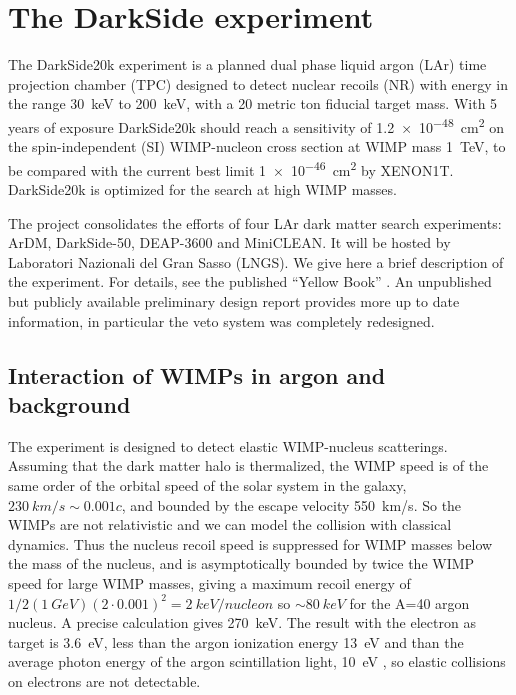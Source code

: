 \chapter{The DarkSide experiment}
\label{ch:darkside}

The DarkSide20k experiment is a planned dual phase liquid argon (LAr) time
projection chamber (TPC) designed to detect nuclear recoils (NR) with energy in
the range \SI{30}{keV} to \SI{200}{keV}, with a 20 metric ton fiducial target
mass. With 5 years of exposure DarkSide20k should reach a sensitivity of
\SI{1.2e-48}{cm^2} on the spin-independent (SI) WIMP-nucleon cross section at
WIMP mass \SI{1}{TeV}, to be compared with the current best limit
\SI{1e-46}{cm^2} by XENON1T. DarkSide20k is optimized for the search at high
WIMP masses.

The project consolidates the efforts of four LAr dark matter search
experiments: ArDM, DarkSide-50, DEAP-3600 and MiniCLEAN. It will be hosted by
Laboratori Nazionali del Gran Sasso (LNGS). We give here a brief description of
the experiment. For details, see the published ``Yellow Book''
\cite{aalseth2018}. An unpublished but publicly available preliminary design
report \cite{aalseth2019} provides more up to date information, in particular
the veto system was completely redesigned.

\section{Interaction of WIMPs in argon and background}

The experiment is designed to detect elastic WIMP-nucleus scatterings. Assuming
that the dark matter halo is thermalized, the WIMP speed is of the same order
of the orbital speed of the solar system in the galaxy, $\SI{230}{km/s}\sim
0.001 c$, and bounded by the escape velocity \SI{550}{km/s}. So the WIMPs are
not relativistic and we can model the collision with classical dynamics. Thus
the nucleus recoil speed is suppressed for WIMP masses below the mass of the
nucleus, and is asymptotically bounded by twice the WIMP speed for large WIMP
masses, giving a maximum recoil energy of $1/2 (\SI{1}{GeV}) (2 \cdot 0.001)^2
= \SI{2}{keV/nucleon}$ so $\sim\SI{80}{keV}$ for the A=40 argon nucleus. A
precise calculation gives \SI{270}{keV}. The result with the electron as target
is \SI{3.6}{eV}, less than the argon ionization energy \SI{13}{eV} and than the
average photon energy of the argon scintillation light, \SI{10}{eV}
\cite[p.~16, 79]{aprile2006}, so elastic collisions on electrons are not
detectable.

